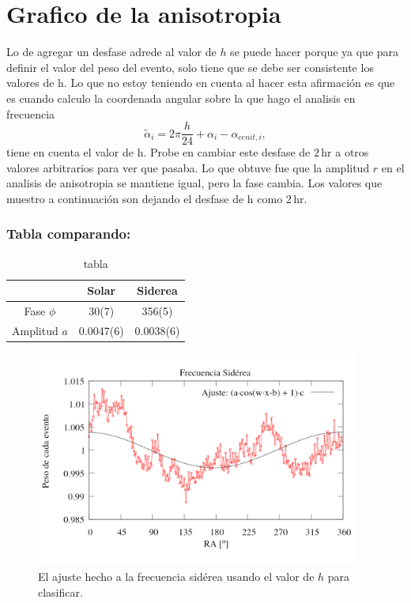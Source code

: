 \section{Grafico de la anisotropia}


		Lo de agregar un desfase adrede al valor de $h$ se puede hacer porque ya que para definir el valor del peso del evento, solo tiene que se debe ser consistente los valores  de h. Lo que no estoy teniendo en cuenta al hacer esta afirmación es que es cuando calculo la coordenada angular sobre la que hago el analisis en frecuencia
		\begin{equation}
			   \tilde{\alpha}_i = 2\pi \frac{h}{24} + \alpha_i -\alpha_{cenit,i},
		\end{equation}
		tiene en cuenta el valor de h. Probe en cambiar este desfase de $2\,$hr a otros valores arbitrarios para ver que pasaba. Lo que obtuve fue que la amplitud $r$ en el analisis de anisotropia se mantiene igual, pero la fase cambia. Los valores que muestro a continuación son dejando el desfase de h como $2\,$hr.
		
	\subsubsection{Tabla comparando:}
		
		\begin{table}[H]
		\centering
		
		\begin{tabular}{c|c|c}
					& Solar 		& Siderea\\ \hline
		Fase $\phi$ & 30(7) 	    & 356(5) 			\\
		Amplitud $a$& 0.0047(6)	    &0.0038(6)			\\
		\end{tabular}
		\caption{tabla}
		\end{table}
		
		
		
		\begin{figure}[H]
			\centering
			\includegraphics[width=0.95\textwidth]{eventos_RA_ajuste_cos.png}
			\caption{El ajuste hecho a la frecuencia sidérea usando el valor de $h$ para clasificar.}
		\end{figure}
		
